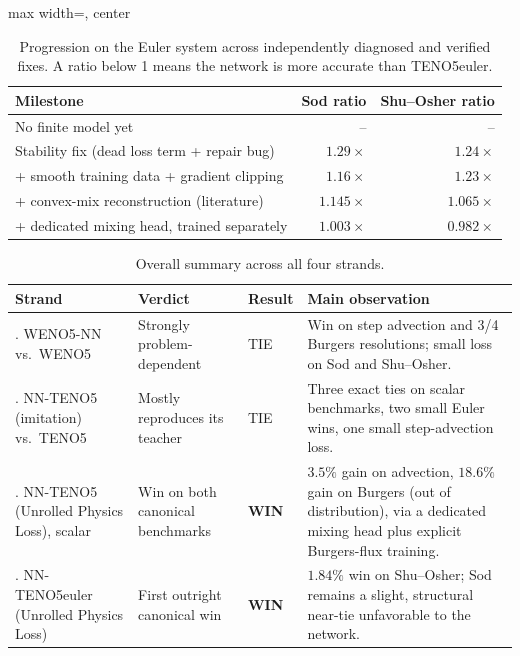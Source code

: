 \documentclass[11pt]{article}
\begin{document}
\begin{table}[htbp]
\begin{adjustbox}{max width=\textwidth, center}
\begin{tabular}{lrr}
\toprule
\textbf{Milestone} & \textbf{Sod ratio} & \textbf{Shu--Osher ratio} \\
\midrule
No finite model yet & -- & -- \\
\rowrule
Stability fix (dead loss term + repair bug) & $1.29\times$ & $1.24\times$ \\
\rowrule
+ smooth training data + gradient clipping & $1.16\times$ & $1.23\times$ \\
\rowrule
+ convex-mix reconstruction (literature) & $1.145\times$ & $1.065\times$ \\
\rowrule
+ dedicated mixing head, trained separately & $\mathbf{1.003\times}$ & $\mathbf{0.982\times}$ \\
\bottomrule
\end{tabular}
\end{adjustbox}
\caption{Progression on the Euler system across independently diagnosed
and verified fixes. A ratio below 1 means the network is more accurate
than TENO5euler.\label{tab:progression}}
\end{table}

\begin{table}[htbp]
\small
\begin{tabularx}{\textwidth}{@{}>{\raggedright\arraybackslash}p{}>{\raggedright\arraybackslash}p{}>{\centering\arraybackslash}p{}>{\raggedright\arraybackslash}X@{}}
\toprule
\textbf{Strand} & \textbf{Verdict} & \textbf{Result} & \textbf{Main observation} \\
\midrule
1. WENO5-NN vs.\ WENO5 & Strongly problem-dependent & TIE & Win on step
advection and 3/4 Burgers resolutions; small loss on Sod and Shu--Osher. \\
\rowrule
2. NN-TENO5 (imitation) vs.\ TENO5 & Mostly reproduces its teacher & TIE &
Three exact ties on scalar benchmarks, two small Euler wins, one small
step-advection loss. \\
\rowrule
3. NN-TENO5 (Unrolled Physics Loss), scalar & Win on both canonical
benchmarks & \textbf{WIN} & $3.5\%$ gain on advection, $18.6\%$ gain on
Burgers (out of distribution), via a dedicated mixing head plus explicit
Burgers-flux training. \\
\rowrule
4. NN-TENO5euler (Unrolled Physics Loss) & First outright canonical win &
\textbf{WIN} & $1.84\%$ win on Shu--Osher; Sod remains a slight,
structural near-tie unfavorable to the network. \\
\bottomrule
\end{tabularx}
\caption{Overall summary across all four strands.}
\end{table}
\end{document}
